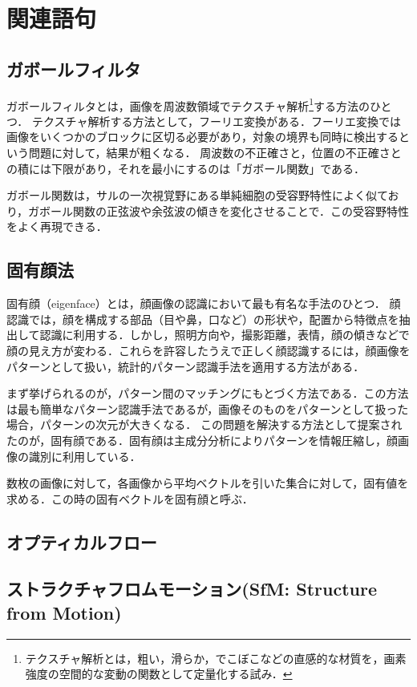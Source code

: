 \chapter{関連語句}
\section{ガボールフィルタ}
ガボールフィルタとは，画像を周波数領域でテクスチャ解析\footnote{テクスチャ解析とは，粗い，滑らか，でこぼこなどの直感的な材質を，画素強度の空間的な変動の関数として定量化する試み\cite{テクスチャ解析}．}する方法のひとつ．
テクスチャ解析する方法として，フーリエ変換がある．フーリエ変換では画像をいくつかのブロックに区切る必要があり，対象の境界も同時に検出するという問題に対して，結果が粗くなる．
周波数の不正確さと，位置の不正確さとの積には下限があり，それを最小にするのは「ガボール関数」である．\par
ガボール関数は，サルの一次視覚野にある単純細胞の受容野特性によく似ており，ガボール関数の正弦波や余弦波の傾きを変化させることで．この受容野特性をよく再現できる．
\begin{flushright}
    \cite[p.144]{認知心理学辞典}
\end{flushright}
\section{固有顔法}
固有顔（eigenface）とは，顔画像の認識において最も有名な手法のひとつ．
顔認識では，顔を構成する部品（目や鼻，口など）の形状や，配置から特徴点を抽出して認識に利用する．しかし，照明方向や，撮影距離，表情，顔の傾きなどで顔の見え方が変わる．これらを許容したうえで正しく顔認識するには，顔画像をパターンとして扱い，統計的パターン認識手法を適用する方法がある．

まず挙げられるのが，パターン間のマッチングにもとづく方法である．この方法は最も簡単なパターン認識手法であるが，画像そのものをパターンとして扱った場合，パターンの次元が大きくなる．
この問題を解決する方法として提案されたのが，固有顔である．固有顔は主成分分析によりパターンを情報圧縮し，顔画像の識別に利用している．

数枚の画像に対して，各画像から平均ベクトルを引いた集合に対して，固有値を求める．この時の固有ベクトルを固有顔と呼ぶ．\par
\hfill\cite{顔画像からの個人識別}
\section{オプティカルフロー}
\section{ストラクチャフロムモーション(SfM: Structure from Motion)}